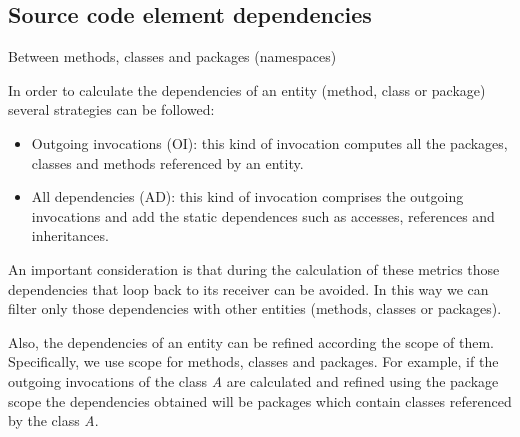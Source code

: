 \documentclass{sig-alternate}
\begin{document}
\subsection{Source code element dependencies}

Between methods, classes and packages (namespaces)

In order to calculate the dependencies of an entity (method, class or package) several strategies can be followed:
\begin{itemize}
\item Outgoing invocations (OI): this kind of invocation computes all the packages, classes and methods referenced by an entity. 
\item All dependencies (AD): this kind of invocation comprises the outgoing invocations and add the static dependences such as accesses, references and inheritances.
\end{itemize}
An important consideration is that during the calculation of these metrics those dependencies that loop back to its receiver can be avoided. In this way we can filter only those dependencies with other entities (methods, classes or packages).

Also, the dependencies of an entity can be refined according the scope of them. Specifically, we use scope for methods, classes and packages. For example, if the outgoing invocations of the class \emph{A} are calculated and refined using the package scope the dependencies obtained will be packages which contain classes referenced by the class \emph{A}.

\end{document}
